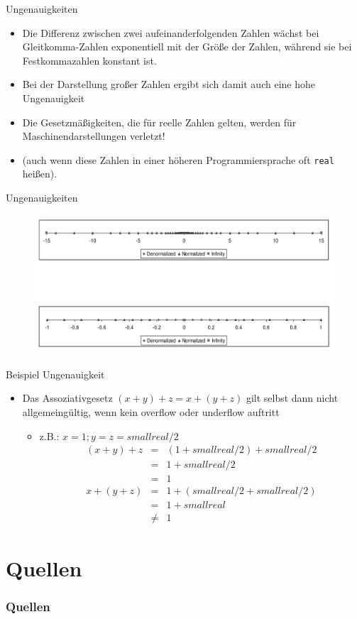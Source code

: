 \documentclass[12pt%
,aspectratio=169%
]{beamer}
\begin{document}
\begin{frame}{Ungenauigkeiten}
\begin{itemize}
	\item Die Differenz zwischen zwei aufeinanderfolgenden Zahlen wächst bei Gleitkomma-Zahlen exponentiell mit der Größe der Zahlen, während sie bei Festkommazahlen konstant ist.
	\item Bei der Darstellung großer Zahlen ergibt sich damit auch eine hohe Ungenauigkeit
	\item Die Gesetzmäßigkeiten, die für reelle Zahlen gelten, werden für Maschinendarstellungen verletzt!
	\item (auch wenn diese Zahlen in einer höheren Programmiersprache oft \texttt{real} heißen).
\end{itemize}
\end{frame}

\begin{frame}{Ungenauigkeiten}
\begin{figure}
\includegraphics[scale=0.3]{pictures/ungenau}
\end{figure}
\end{frame}

\begin{frame}{Beispiel Ungenauigkeit}
\begin{itemize}
	\item Das Assoziativgesetz $(x + y) + z = x + (y + z)$ gilt selbst dann nicht allgemeingültig, wenn kein overflow oder underflow auftritt
	\begin{itemize}
		\item z.B.: $x = 1; y = z = smallreal/2$
		\begin{align*}
		(x + y) + z & = & (1 + smallreal/2) + smallreal/2 \\
		& = & 1 + smallreal/2 \\
		& = & 1 \\
		x + (y + z) & = & 1 + (smallreal/2 + smallreal/2)\\
		& = & 1 + smallreal\\
		& \neq & 1 
		\end{align*}
	\end{itemize}
\end{itemize}
\end{frame}


\section*{Quellen}
\appendix
\begin{frame}[allowframebreaks]
  \frametitle<presentation>{Quellen}
\printbibliography
\end{frame}
\end{document}
